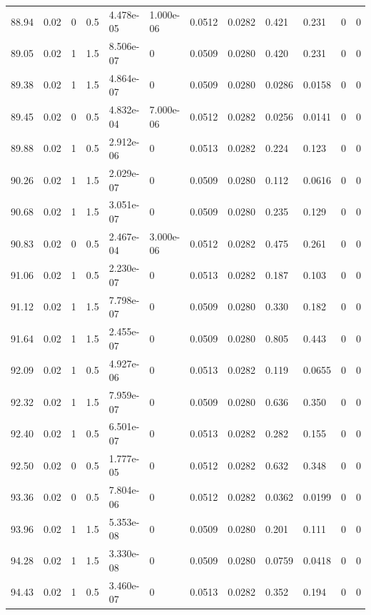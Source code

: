 \documentclass[preview]{standalone}
\begin{document}
{{{{{{{\begin{tabular}{L{1.2cm}C{1.2cm} C{0.3cm}C{0.5cm} C{1.4cm}C{1.4cm} C{1.4cm}C{1.4cm} C{1.6cm}C{1.6cm} C{1.6cm}C{1.6cm}}
  88.94  &  0.02  & 0     & 0.5 &  4.478e-05  & 1.000e-06  &  0.0512&   0.0282& 0.421 & 0.231   &  0 & 0  \\ 
  89.05  &  0.02  & 1     & 1.5 &  8.506e-07  & 0  &  0.0509&   0.0280& 0.420 & 0.231   &  0 & 0  \\ 
  89.38  &  0.02  & 1     & 1.5 &  4.864e-07  & 0  &  0.0509&   0.0280& 0.0286 & 0.0158   &  0 & 0  \\ 
  89.45  &  0.02  & 0     & 0.5 &  4.832e-04  & 7.000e-06  &  0.0512&   0.0282& 0.0256 & 0.0141   &  0 & 0  \\ 
  89.88  &  0.02  & 1     & 0.5 &  2.912e-06  & 0  &  0.0513&   0.0282& 0.224 & 0.123   &  0 & 0  \\ 
  90.26  &  0.02  & 1     & 1.5 &  2.029e-07  & 0  &  0.0509&   0.0280& 0.112 & 0.0616   &  0 & 0  \\ 
  90.68  &  0.02  & 1     & 1.5 &  3.051e-07  & 0  &  0.0509&   0.0280& 0.235 & 0.129   &  0 & 0  \\ 
  90.83  &  0.02  & 0     & 0.5 &  2.467e-04  & 3.000e-06  &  0.0512&   0.0282& 0.475 & 0.261   &  0 & 0  \\ 
  91.06  &  0.02  & 1     & 0.5 &  2.230e-07  & 0  &  0.0513&   0.0282& 0.187 & 0.103   &  0 & 0  \\ 
  91.12  &  0.02  & 1     & 1.5 &  7.798e-07  & 0  &  0.0509&   0.0280& 0.330 & 0.182   &  0 & 0  \\ 
  91.64  &  0.02  & 1     & 1.5 &  2.455e-07  & 0  &  0.0509&   0.0280& 0.805 & 0.443   &  0 & 0  \\ 
  92.09  &  0.02  & 1     & 0.5 &  4.927e-06  & 0  &  0.0513&   0.0282& 0.119 & 0.0655   &  0 & 0  \\ 
  92.32  &  0.02  & 1     & 1.5 &  7.959e-07  & 0  &  0.0509&   0.0280& 0.636 & 0.350   &  0 & 0  \\ 
  92.40  &  0.02  & 1     & 0.5 &  6.501e-07  & 0  &  0.0513&   0.0282& 0.282 & 0.155   &  0 & 0  \\ 
  92.50  &  0.02  & 0     & 0.5 &  1.777e-05  & 0  &  0.0512&   0.0282& 0.632 & 0.348   &  0 & 0  \\ 
  93.36  &  0.02  & 0     & 0.5 &  7.804e-06  & 0  &  0.0512&   0.0282& 0.0362 & 0.0199   &  0 & 0  \\ 
  93.96  &  0.02  & 1     & 1.5 &  5.353e-08  & 0  &  0.0509&   0.0280& 0.201 & 0.111   &  0 & 0  \\ 
  94.28  &  0.02  & 1     & 1.5 &  3.330e-08  & 0  &  0.0509&   0.0280& 0.0759 & 0.0418   &  0 & 0  \\ 
  94.43  &  0.02  & 1     & 0.5 &  3.460e-07  & 0  &  0.0513&   0.0282& 0.352 & 0.194   &  0 & 0  \\ 

\end{tabular}}}}}}}}
\end{document}

